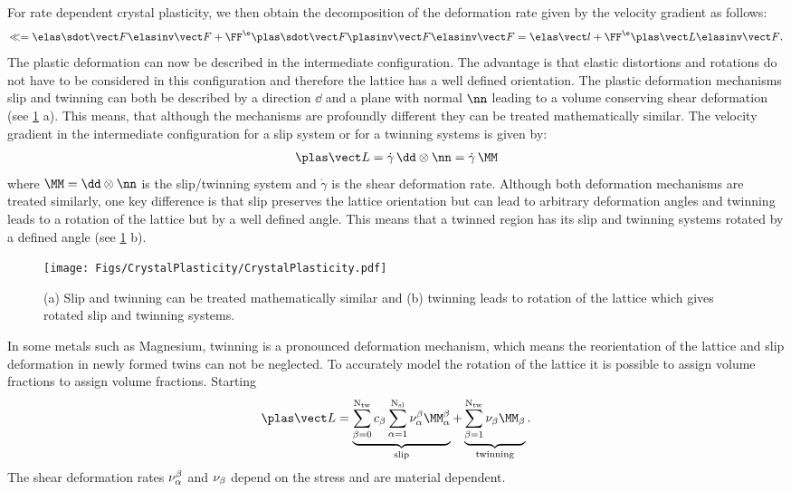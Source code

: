  For rate dependent crystal plasticity, we then obtain the decomposition of the deformation rate given by the velocity gradient as follows:
\begin{align}
  \ll = \FFedot\FFeinv + \FFe \FFpdot \FFpinv \FFeinv = \lle + \FFe\LLp\FFeinv.
\end{align}
The plastic deformation can now be described in the intermediate configuration. The advantage is that elastic distortions and rotations do not have to be considered in this configuration and therefore the lattice has a well defined orientation. The plastic deformation mechanisms slip and twinning can both be described by a direction $\dd$ and a plane with normal $\nn$ leading to a volume conserving shear deformation (see \cref{fig:CrystalPlasticity} a). This means, that although the mechanisms are profoundly different they can be treated mathematically similar. The velocity gradient in the intermediate configuration for a slip system or for a twinning systems is given by:
\begin{align}
  \LLp = \dot\gamma \, \dd\otimes\nn = \dot\gamma\,\MM
\end{align}
where $\MM=\dd\otimes\nn$ is the slip/twinning system and $\dot\gamma$ is the shear deformation rate. Although both deformation mechanisms are treated similarly, one key difference is that slip preserves the lattice orientation but can lead to arbitrary deformation angles and twinning leads to a rotation of the lattice but by a well defined angle. This means that a twinned region has its slip and twinning systems rotated by a defined angle (see \cref{fig:CrystalPlasticity} b). \\ 
\begin{figure}[h!]
  \centering
  \texttt{[image: Figs/CrystalPlasticity/CrystalPlasticity.pdf]}
  \caption{(a) Slip and twinning can be treated mathematically similar and (b) twinning leads to rotation of the lattice which gives rotated slip and twinning systems.}
  \label{fig:CrystalPlasticity}
\end{figure}

In some metals such as Magnesium, twinning is a pronounced deformation mechanism, which means the reorientation of the lattice and slip deformation in newly formed twins can not be neglected. To accurately model the rotation of the lattice it is possible to assign volume fractions to assign volume fractions. Starting 
\begin{equation}
  \LLp = \underbrace{\sumbO \cb \sumaI \nuab \MMab}_{\text{slip}} + \underbrace{\sumbI \nub \MMb}_{\text{twinning}}.
  \label{eq:LLp}
\end{equation}
The shear deformation rates $\nu_{\alpha}^{\beta}$ and $\nu_{\beta}$ depend on the stress and are material dependent.


